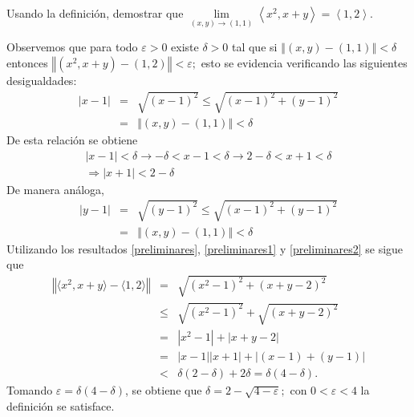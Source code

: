 \begin{parrafoitemize}
\item Usando la definición, demostrar que $\lim\limits_{(x,y) \rightarrow \left( 1,1\right) }\left\langle
  x^{2},x+y\right\rangle =\left\langle 1,2\right\rangle $.

  Observemos que  para todo $\varepsilon >0$ existe $\delta >0$ tal que si
  $\left\Vert(x,y) -\left( 1,1\right) \right\Vert <\delta $
  entonces $\left\Vert \left( x^{2},x+y\right) -\left( 1,2\right) \right\Vert<\varepsilon ;$ esto se evidencia verificando las siguientes desigualdades:
  \begin{eqnarray}\label{preliminares}
    \left\vert x-1\right\vert &=&\sqrt{(x-1) ^{2}}\leq \sqrt{\left(
    x-1\right) ^{2}+(y-1) ^{2}} \nonumber \\ &=&\left\Vert \left(x,y\right) -\left( 1,1\right) \right\Vert <\delta
  \end{eqnarray}
  De esta relación se obtiene
  \begin{multline}\label{preliminares1}
    |x-1|<\delta \rightarrow -\delta <x-1<\delta
    \rightarrow 2-\delta <x+1<\delta  \\
    \Rightarrow \left\vert x+1\right\vert<2-\delta
  \end{multline}
  De manera análoga,
  \begin{eqnarray}\label{preliminares2}
    \left\vert y-1\right\vert &=& \sqrt{(y-1) ^{2}}\leq \sqrt{\left(x-1\right) ^{2}+(y-1)  ^{2}} \nonumber \\ &=& \left\Vert \left(x,y\right) -\left( 1,1\right) \right\Vert <\delta
  \end{eqnarray}
  Utilizando los resultados \ref{preliminares}, \ref{preliminares1} y \ref{preliminares2} se sigue que
  \begin{eqnarray*}
    \left\Vert \langle x^{2},x+y\rangle -\langle 1,2\rangle \right\Vert &=& \sqrt{\left( x^{2}-1\right) ^{2}+\left( x+y-2\right) ^{2}} \\
    &\leq & \sqrt{\left( x^{2}-1\right) ^{2}} +\sqrt{\left(x+y-2\right) ^{2}} \\
    &=& \left\vert x^{2}-1\right\vert  +\left\vert x+y-2\right\vert \\
    &=& \left\vert x-1\right\vert  \left\vert x+1\right\vert +\left\vert (x-1) +(y-1) \right\vert \\
    &<& \delta (2-\delta) +2\delta = \delta (4-\delta).
  \end{eqnarray*}
  Tomando $\varepsilon =\delta \left( 4-\delta \right) $, se obtiene que
  $\delta =2-\sqrt{4-\varepsilon };$ con $0<\varepsilon < 4$ la definición se satisface.


\end{parrafoitemize}
